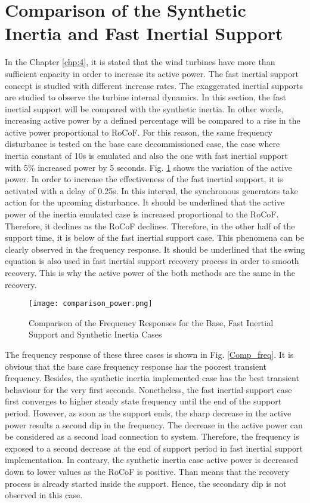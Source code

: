 \section{Comparison of the Synthetic Inertia and Fast Inertial Support}
In the Chapter \ref{chp:4}, it is stated that the wind turbines have more than sufficient capacity in order to increase its active power. The fast inertial support concept is studied with different increase rates. The exaggerated inertial supports are studied to observe the turbine internal dynamics. In this section, the fast inertial support will be compared with the synthetic inertia. In other words, increasing active power by a defined percentage will be compared to a rise in the active power proportional to RoCoF. For this reason, the same frequency disturbance is tested on the base case decommissioned case, the case where inertia constant of 10s is emulated and also the one with fast inertial support with 5\% increased power by 5 seconds. Fig. \ref{Comp_power} shows the variation of the active power. In order to increase the effectiveness of the fast inertial support, it is activated with a delay of 0.25s. In this interval, the synchronous generators take action for the upcoming disturbance. It should be underlined that the active power of the inertia emulated case is increased proportional to the RoCoF. Therefore, it declines as the RoCoF declines. Therefore, in the other half of the support time, it is below of the fast inertial support case. This phenomena can be clearly observed in the frequency response. It should be underlined that the swing equation is also used in fast inertial support recovery process in order to smooth recovery. This is why the active power of the both methods are the same in the recovery.\par
\begin{figure}[h]
	\centering
	\texttt{[image: comparison\_power.png]}
	\caption{Comparison of the Frequency Responses for the Base, Fast Inertial Support and Synthetic Inertia Cases}
	\label{Comp_power}
\end{figure}
The frequency response of these three cases is shown in Fig. \ref{Comp_freq}. It is obvious that the base case frequency response has the poorest transient frequency. Besides, the synthetic inertia implemented case has the best transient behaviour for the very first seconds. Nonetheless, the fast inertial support case first converges to higher steady state frequency until the end of the support period. However, as soon as the support ends, the sharp decrease in the active power results a second dip in the frequency. The decrease in the active power can be considered as a second load connection to system. Therefore, the frequency is exposed to a second decrease at the end of support period in fast inertial support implementation. In contrary, the synthetic inertia case active power is decreased down to lower values as the RoCoF is positive. Than means that the recovery process is already started inside the support. Hence, the secondary dip is not observed in this case. \par
